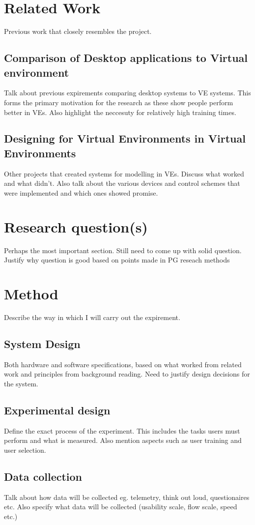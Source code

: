 \documentclass{sig-alternate-05-2015}
\begin{document}
\section{Related Work}
Previous work that closely resembles the project.
\subsection{Comparison of Desktop applications to Virtual environment}
Talk about previous expirements comparing desktop systems to VE systems. This forms the primary motivation for the research as these show people perform better in VEs. Also highlight the neccesuty for relatively high training times.
\subsection{Designing for Virtual Environments in Virtual Environments}
Other projects that created systems for modelling in VEs. Discuss what worked and what didn't. Also talk about the various devices and control schemes that were implemented and which ones showed promise.
\section{Research question(s)}
Perhaps the most important section. Still need to come up with solid question. Justify why question is good based on points made in PG reseach methods
\section{Method}
Describe the way in which I will carry out the expirement.
\subsection{System Design}
Both hardware and software specifications, based on what worked from related work and principles from background reading. Need to justify design decisions for the system.
\subsection{Experimental design}
Define the exact process of the experiment. This includes the tasks users must perform and what is measured. Also mention aspects such as user training and user selection.
\subsection{Data collection}
Talk about how data will be collected eg. telemetry, think out loud, questionaires etc. Also specify what data will be collected (usability scale, flow scale, speed etc.)
\end{document}
